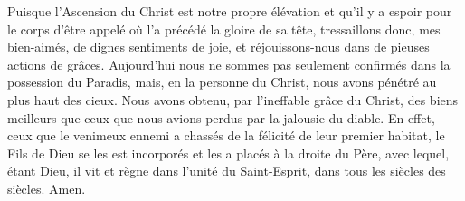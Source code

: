 Puisque l’Ascension du Christ est notre propre élévation
	et qu’il y a espoir pour le corps d’être appelé
		où l’a précédé la gloire de sa tête,
	tressaillons donc, mes bien-aimés, de dignes sentiments de joie,
	et réjouissons-nous dans de pieuses actions de grâces.
Aujourd’hui
		nous ne sommes pas seulement confirmés dans la possession du Paradis,
		mais, en la personne du Christ,
		nous avons pénétré au plus haut des cieux.
Nous avons obtenu, par l’ineffable grâce du Christ,
	des biens meilleurs que ceux que nous avions perdus
		par la jalousie du diable.
En effet, ceux que le venimeux ennemi
		a chassés de la félicité de leur premier habitat,
	le Fils de Dieu se les est incorporés et les a placés à la droite du Père,
	avec lequel, étant Dieu, il vit et règne dans l’unité du Saint-Esprit,
	dans tous les siècles des siècles. Amen.
